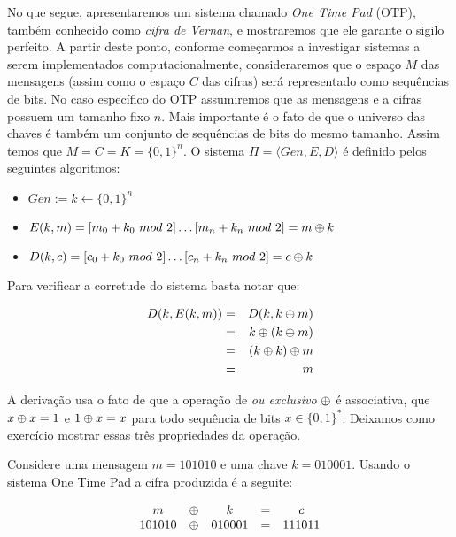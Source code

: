 No que segue, apresentaremos um sistema chamado {\em One Time Pad} (OTP), também conhecido como {\em cifra de Vernan}, e mostraremos que ele garante o sigilo perfeito.
A partir deste ponto, conforme começarmos a investigar sistemas a serem implementados computacionalmente, consideraremos que o espaço $M$ das mensagens (assim como o espaço $C$ das cifras) será representado como sequências de bits.
No caso específico do OTP assumiremos que as mensagens e a cifras possuem um tamanho fixo $n$.
Mais importante é o fato de que o universo das chaves é também um conjunto de sequências de bits do mesmo tamanho.
Assim temos que $M = C = K = \{0,1\}^n$.
O sistema $\Pi = \langle Gen, E, D \rangle$ é definido pelos seguintes algoritmos:
\begin{itemize}
\item $Gen := k \leftarrow \{0,1\}^n$
\item $E(k,m) = [m_0 + k_0\ mod\ 2] \dots [m_n + k_n\ mod\ 2] = m \oplus k$
\item $D(k,c) = [c_0 + k_0\ mod\ 2] \dots [c_n + k_n\ mod\ 2] = c \oplus k$
\end{itemize}

Para verificar a corretude do sistema basta notar que:

\begin{eqnarray*}
  D(k, E(k, m)) & = & D(k, k \oplus m)\\
                & = & k \oplus (k \oplus m)\\
                & = & (k \oplus k) \oplus m\\
                & = & m
\end{eqnarray*}

A derivação usa o fato de que a operação de {\em ou exclusivo} $\oplus$ é associativa, que $x \oplus x = 1$ e $1 \oplus x = x$ para todo sequência de bits $x \in \{0,1\}^*$.
Deixamos como exercício mostrar essas três propriedades da operação.

\begin{example}
  Considere uma mensagem $m = 101010$ e uma chave $k = 010001$.
Usando o sistema One Time Pad a cifra produzida é a seguite:

\begin{displaymath}
  \begin{array}{ccccc}
    m & \oplus & k & = & c \\
    101010 & \oplus & 010001 & = & 111011
  \end{array}
\end{displaymath}
\end{example}

